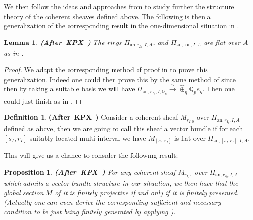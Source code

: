 \documentclass[12pt]{amsart}
\newtheorem{lemma}[theorem]{Lemma}
\newtheorem{proposition}[theorem]{Proposition}
\theoremstyle{definition}
\newtheorem{definition}[theorem]{Definition}
\numberwithin{equation}{section}
\begin{document}
\indent We then follow the ideas and approaches from \cite{KPX} to 
study further the structure theory of the coherent sheaves defined above. The following is then a generalization of the corresponding result in the one-dimensional situation in \cite[Corollary 2.1.5]{KPX}.

\begin{lemma} \mbox{\bf{(After KPX \cite[Corollary 2.1.5]{KPX})}}
The rings $\Pi_{\mathrm{an},r_{I_0},I,A}$, and $\Pi_{\mathrm{an},\mathrm{con},I,A}$ are flat over $A$ as in \cite[Corollary 2.1.5]{KPX}.	
\end{lemma}


\begin{proof}
We adapt the corresponding method of proof in \cite[Corollary 2.1.5]{KPX} to prove this generalization. Indeed one could then prove this by the same method of \cite[Corollary 2.1.5]{KPX} since then by taking a suitable basis we will have $\Pi_{\mathrm{an},r_{I_0},I,\mathbb{Q}_p}\overset{\simeq}{\rightarrow}\widehat{\oplus}_{\eta}\mathbb{Q}_pe_\eta$. Then one could just finish as in \cite[Corollary 2.1.5]{KPX}. 	
\end{proof}



\begin{definition} \mbox{\bf{(After KPX \cite[Definition 2.1.3]{KPX})}}
Consider a coherent sheaf $M_{r_{I,0}}$ over $\Pi_{\mathrm{an},r_{I_0},I,A}$ defined as above, then we are going to call this sheaf a vector bundle if for each $[s_I,r_I]$ suitably located multi interval we have $M_{[s_I,r_I]}$ is flat over $\Pi_{\mathrm{an},[s_I,r_I],I,A}$.	
\end{definition}


\indent This will give us a chance to consider the following result:

\begin{proposition} \mbox{\bf{(After KPX \cite[Lemma 2.1.6]{KPX})}} \label{prop2.12}
For any coherent sheaf $M_{r_{I,0}}$ over $\Pi_{\mathrm{an},r_{I_0},I,A}$ which admits a vector bundle structure in our situation, we then have that the global section $M$ of it is finitely projective if and only if it is finitely presented. (Actually one can even derive the corresponding sufficient and necessary condition to be just being finitely generated by applying \cite[Corollary 2.6.8]{KL2}). 	
\end{proposition}
\end{document}

